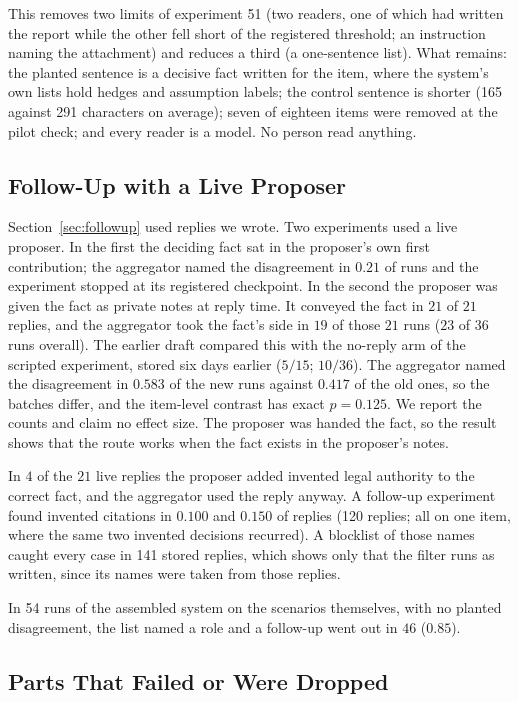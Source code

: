 \documentclass[10pt,twocolumn]{article}
\begin{document}
This removes two limits of experiment 51 (two readers, one of which
had written the report while the other fell short of the registered
threshold; an instruction naming the attachment) and reduces a third (a
one-sentence list). What remains: the planted sentence is a decisive fact written
for the item, where the system's own lists hold hedges and assumption
labels; the control sentence is shorter (165 against 291 characters on
average); seven of eighteen items were removed at the pilot check; and
every reader is a model. No person read anything.

\subsection{Follow-Up with a Live Proposer}
\label{sec:res-loop}

Section~\ref{sec:followup} used replies we wrote. Two experiments used
a live proposer. In the first the deciding fact sat in the proposer's
own first contribution; the aggregator named the disagreement in
$0.21$ of runs and the experiment stopped at its registered checkpoint.
In the second the proposer was given the fact as private notes at reply
time. It conveyed the fact in $21$ of $21$ replies, and the aggregator
took the fact's side in $19$ of those $21$ runs ($23$ of $36$ runs
overall). The earlier draft compared this with the no-reply arm of the
scripted experiment, stored six days earlier ($5/15$; $10/36$). The
aggregator named the disagreement in $0.583$ of the new runs against
$0.417$ of the old ones, so the batches differ, and the item-level
contrast has exact $p=0.125$. We report the counts and claim no effect
size. The proposer was handed the fact, so the result shows that the
route works when the fact exists in the proposer's notes.

In $4$ of the $21$ live replies the proposer added invented legal
authority to the correct fact, and the aggregator used the reply
anyway. A follow-up experiment found invented citations in $0.100$ and
$0.150$ of replies (120 replies; all on one item, where the same two
invented decisions recurred). A blocklist of those names caught every
case in 141 stored replies, which shows only that the filter runs as
written, since its names were taken from those replies.

In 54 runs of the assembled system on the scenarios themselves, with
no planted disagreement, the list named a role and a follow-up went out
in $46$ ($0.85$).

\subsection{Parts That Failed or Were Dropped}
\label{sec:ablations}
\end{document}
